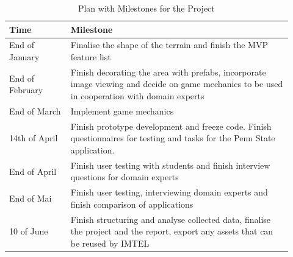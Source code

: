     \FloatBarrier
    \begin{table}
    \label{tab:plan}
    \caption{Plan with Milestones for the Project}
    \begin{tabular}{| p{0.2\linewidth} | p{0.725\linewidth} |}
        \hline
        \textbf{Time} & \textbf{Milestone} \\
        \hline
        End of January & Finalise the shape of the terrain and finish the MVP feature list \\
        End of February & Finish decorating the area with prefabs, incorporate image viewing and decide on game mechanics to be used in cooperation with domain experts \\
        End of March & Implement game mechanics \\
        14th of April & Finish prototype development and freeze code. Finish questionnaires for testing and tasks for the Penn State application. \\
        End of April & Finish user testing with students and finish interview questions for domain experts \\
        End of Mai & Finish user testing, interviewing domain experts and finish comparison of applications \\
        10 of June & Finish structuring and analyse collected data, finalise the project and the report, export any assets that can be reused by IMTEL \\
        \hline
    \end{tabular}
    \end{table}
    \FloatBarrier

